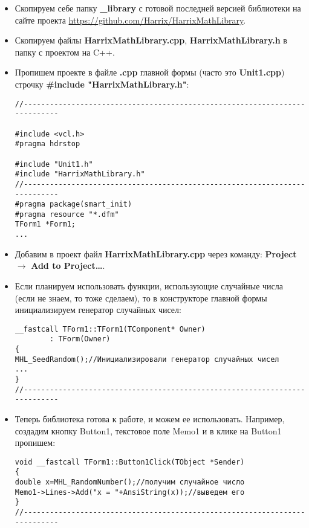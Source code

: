 \begin{itemize}
\item Скопируем себе папку \textbf{\_library} с готовой последней версией библиотеки на сайте проекта \href{https://github.com/Harrix/HarrixMathLibrary}{https://github.com/Harrix/HarrixMathLibrary}.

\item Скопируем файлы \textbf{HarrixMathLibrary.cpp}, \textbf{HarrixMathLibrary.h} в папку с проектом на C++.

\item Пропишем проекте в файле \textbf{.cpp} главной формы (часто это \textbf{Unit1.cpp}) строчку \textbf{\#include "HarrixMathLibrary.h"}:
\begin{lstlisting}[label=install_code_01,caption=Подключение библиотеки]
//---------------------------------------------------------------------------

#include <vcl.h>
#pragma hdrstop

#include "Unit1.h"
#include "HarrixMathLibrary.h"
//---------------------------------------------------------------------------
#pragma package(smart_init)
#pragma resource "*.dfm"
TForm1 *Form1;
...
\end{lstlisting}

\item Добавим в проект файл \textbf{HarrixMathLibrary.cpp} через команду: \textbf{Project} $\rightarrow$ \textbf{Add to Project\dots}.

\item Если планируем использовать функции, использующие случайные числа (если не знаем, то тоже сделаем), то в конструкторе главной формы инициализируем генератор случайных чисел:
\begin{lstlisting}[label=install_code_02,caption=Инициализация генератора случайных чисел]
__fastcall TForm1::TForm1(TComponent* Owner)
        : TForm(Owner)
{
MHL_SeedRandom();//Инициализировали генератор случайных чисел
...
}
//---------------------------------------------------------------------------
\end{lstlisting}

\item Теперь библиотека готова к работе, и можем ее использовать. Например, создадим кнопку Button1, текстовое поле Memo1 и в клике на Button1 пропишем:
\begin{lstlisting}[label=install_code_03,caption=Пример использования]
void __fastcall TForm1::Button1Click(TObject *Sender)
{
double x=MHL_RandomNumber();//получим случайное число
Memo1->Lines->Add("x = "+AnsiString(x));//выведем его
}
//---------------------------------------------------------------------------
\end{lstlisting}
\end{itemize}

